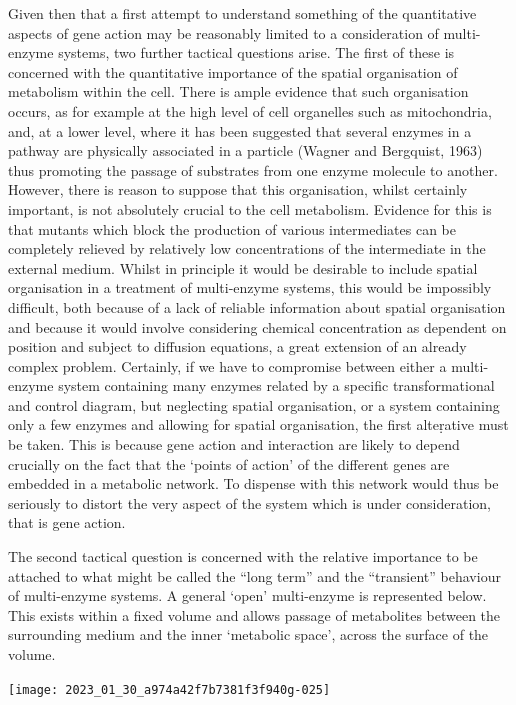 Given then that a first attempt to understand something of the quantitative aspects of gene action may be reasonably limited to a consideration of multi-enzyme systems, two further tactical questions arise. The first of these is concerned with the quantitative importance of the spatial organisation of metabolism within the cell. There is ample evidence that such organisation occurs, as for example at the high level of cell organelles such as mitochondria, and, at a lower level, where it has been suggested that several enzymes in a pathway are physically associated in a particle (Wagner and Bergquist, 1963) thus promoting the passage of substrates from one enzyme molecule to another. However, there is reason to suppose that this organisation, whilst certainly important, is not absolutely crucial to the cell metabolism. Evidence for this is that mutants which block the production of various intermediates can be completely relieved by relatively low concentrations of the intermediate in the external medium. Whilst in principle it would be desirable to include spatial organisation in a treatment of multi-enzyme systems, this would be impossibly difficult, both because of a lack of reliable information about spatial organisation and because it would involve considering chemical concentration as dependent on position and subject to diffusion equations, a great extension of an already complex problem. Certainly, if we have to compromise between either a multi-enzyme system containing many enzymes related by a specific transformational and control diagram, but neglecting spatial organisation, or a system containing only a few enzymes and allowing for spatial organisation, the first alteṛative must be taken. This is because gene action and interaction are likely to depend crucially on the fact that the `points of action' of the different genes are embedded in a metabolic network. To dispense with this network would thus be seriously to distort the very aspect of the system which is under consideration, that is gene action.

The second tactical question is concerned with the relative importance to be attached to what might be called the ``long term'' and the ``transient'' behaviour of multi-enzyme systems. A general `open' multi-enzyme is represented below. This exists within a fixed volume and allows passage of metabolites between the surrounding medium and the inner `metabolic space', across the surface of the volume.

\centerline{\texttt{[image: 2023\_01\_30\_a974a42f7b7381f3f940g-025]}}

